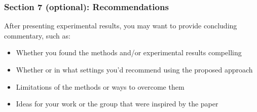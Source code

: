 \documentclass[10pt, aspectratio=169]{beamer}
\begin{document}
\begin{frame}
\frametitle{Section 7 (optional): Recommendations}
After presenting experimental results, you may want to provide concluding commentary, such as:

\vspace{1em}
\begin{itemize}
    \item Whether you found the methods and/or experimental results compelling
    \item Whether or in what settings you'd recommend using the proposed approach
    \item Limitations of the methods or ways to overcome them
    \item Ideas for your work or the group that were inspired by the paper
\end{itemize}
\end{frame}
\end{document}
